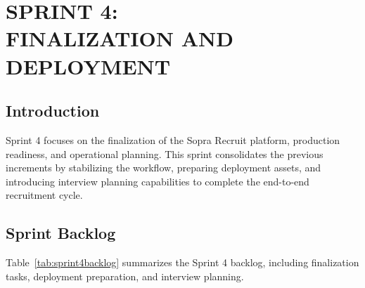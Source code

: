 ﻿\chapter[SPRINT 4: FINALIZATION AND DEPLOYMENT]{SPRINT 4:\\ FINALIZATION AND DEPLOYMENT}
\thispagestyle{MyStyle}
\minitoc
\newpage
\thispagestyle{MyStyle}

\section*{Introduction}

Sprint 4 focuses on the finalization of the Sopra Recruit platform, production readiness, and operational planning. This sprint consolidates the previous increments by stabilizing the workflow, preparing deployment assets, and introducing interview planning capabilities to complete the end-to-end recruitment cycle.

\section{Sprint Backlog}

Table~\ref{tab:sprint4backlog} summarizes the Sprint 4 backlog, including finalization tasks, deployment preparation, and interview planning.

